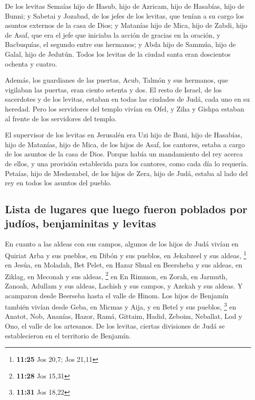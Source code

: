 \begin{paracol}{2}
 De los levitas Semaías hijo de Hasub, hijo de Azricam,
hijo de Hasabías, hijo de Bunni;  y Sabetai y Jozabad, de
los jefes de los levitas, que tenían a su cargo los asuntos externos de
la casa de Dios;  y Matanías hijo de Mica, hijo de Zabdi,
hijo de Asaf, que era el jefe que iniciaba la acción de gracias en la
oración, y Bacbuquías, el segundo entre sus hermanos; y Abda hijo de
Sammúa, hijo de Galal, hijo de Jedutún.  Todos los
levitas de la ciudad santa eran doscientos ochenta y cuatro.

 Además, los guardianes de las puertas, Acub, Talmón y
sus hermanos, que vigilaban las puertas, eran ciento setenta y dos.
 El resto de Israel, de los sacerdotes y de los levitas,
estaban en todas las ciudades de Judá, cada uno en su heredad.
 Pero los servidores del templo vivían en Ofel, y Ziha y
Gishpa estaban al frente de los servidores del templo.

 El supervisor de los levitas en Jerusalén era Uzi hijo
de Bani, hijo de Hasabías, hijo de Matanías, hijo de Mica, de los hijos
de Asaf, los cantores, estaba a cargo de los asuntos de la casa de Dios.
 Porque había un mandamiento del rey acerca de ellos, y
una provisión establecida para los cantores, como cada día lo requería.
 Petaías, hijo de Meshezabel, de los hijos de Zera, hijo
de Judá, estaba al lado del rey en todos los asuntos del pueblo.

\hypertarget{lista-de-lugares-que-luego-fueron-poblados-por-juduxedos-benjaminitas-y-levitas}{%
\subsection{Lista de lugares que luego fueron poblados por judíos,
benjaminitas y
levitas}\label{lista-de-lugares-que-luego-fueron-poblados-por-juduxedos-benjaminitas-y-levitas}}

 En cuanto a las aldeas con sus campos, algunos de los
hijos de Judá vivían en Quiriat Arba y sus pueblos, en Dibón y sus
pueblos, en Jekabzeel y sus aldeas, \footnote{\textbf{11:25} Jos 20,7;
  Jos 21,11}  en Jesúa, en Moladah, Bet Pelet,
 en Hazar Shual en Beersheba y sus aldeas,
 en Ziklag, en Meconah y sus aldeas, \footnote{\textbf{11:28}
  Jos 15,31}  en En Rimmon, en Zorah, en Jarmuth,
 Zanoah, Adullam y sus aldeas, Lachish y sus campos, y
Azekah y sus aldeas. Y acamparon desde Beerseba hasta el valle de Hinom.
 Los hijos de Benjamín también vivían desde Geba, en
Micmas y Aija, y en Betel y sus pueblos, \footnote{\textbf{11:31} Jos
  18,22}  en Anatot, Nob, Ananías,  Hazor,
Ramá, Gittaim,  Hadid, Zeboim, Neballat, 
Lod y Ono, el valle de los artesanos.  De los levitas,
ciertas divisiones de Judá se establecieron en el territorio de
Benjamín.


\end{paracol}
